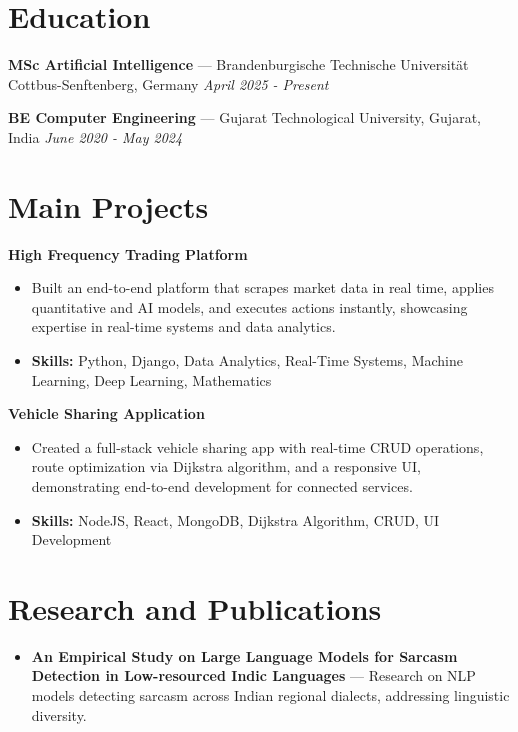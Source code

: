 \documentclass[a4paper,10pt]{article}
\begin{document}
\section*{Education}
\textbf{MSc Artificial Intelligence} — Brandenburgische Technische Universität Cottbus-Senftenberg, Germany \hfill \textit{April 2025 - Present}\par
\vspace{1.5pt}
\textbf{BE Computer Engineering} — Gujarat Technological University, Gujarat, India \hfill \textit{June 2020 - May 2024}\par

\section*{Main Projects}
\textbf{High Frequency Trading Platform}\par
\vspace{1pt}
\begin{itemize}
  \item Built an end-to-end platform that scrapes market data in real time, applies quantitative and AI models, and executes actions instantly, showcasing expertise in real-time systems and data analytics.
  \item \textbf{Skills:} Python, Django, Data Analytics, Real-Time Systems, Machine Learning, Deep Learning, Mathematics
\end{itemize}
\vspace{3pt}
\textbf{Vehicle Sharing Application}\par
\vspace{1pt}
\begin{itemize}
  \item Created a full-stack vehicle sharing app with real-time CRUD operations, route optimization via Dijkstra algorithm, and a responsive UI, demonstrating end-to-end development for connected services.
  \item \textbf{Skills:} NodeJS, React, MongoDB, Dijkstra Algorithm, CRUD, UI Development
\end{itemize}

\section*{Research and Publications}
\begin{itemize}
\item \textbf{An Empirical Study on Large Language Models for Sarcasm Detection in Low-resourced Indic Languages} — Research on NLP models detecting sarcasm across Indian regional dialects, addressing linguistic diversity.
\end{itemize}
\end{document}
